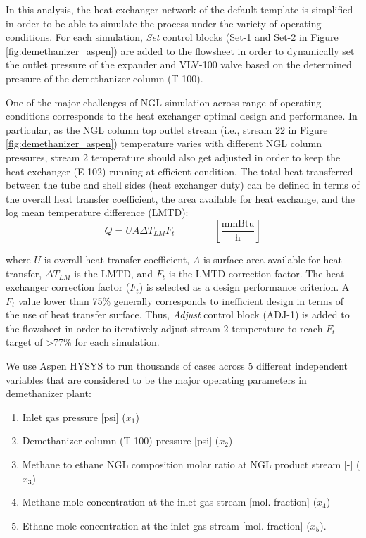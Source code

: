 \documentclass[11pt]{report}
\newcommand{\eqnunitfrac}[2]{\quad\quad \scriptstyle{\left[\frac{\text{#1}}{\text{#2}}\right]}}
\begin{document}
In this analysis, the heat exchanger network of the default template is simplified in order to be able to simulate the process under the variety of operating conditions. For each simulation, \emph{Set} control blocks (Set-1 and Set-2 in Figure \ref{fig:demethanizer_aspen}) are added to the flowsheet in order to dynamically set the outlet pressure of the expander and VLV-100 valve based on the determined pressure of the demethanizer column (T-100). 

One of the major challenges of NGL simulation across range of operating conditions corresponds to the heat exchanger optimal design and performance. In particular, as the NGL column top outlet stream (i.e., stream 22 in Figure \ref{fig:demethanizer_aspen}) temperature varies with different NGL column pressures, stream 2 temperature should also get adjusted in order to keep the heat exchanger (E-102) running at efficient condition. The total heat transferred between the tube and shell sides (heat exchanger duty) can be defined in terms of the overall heat transfer coefficient, the area available for heat exchange, and the log mean temperature difference (LMTD):
\begin{equation} \label{eq:shell_and_tube_HE}
Q=UA\Delta T_{LM}F_{t} \quad\quad\eqnunitfrac{mmBtu}{h}
\end{equation}

where $U$ is overall heat transfer coefficient, $A$ is surface area available for heat transfer, $\Delta T_{LM}$ is the LMTD, and $F_{t}$ is the LMTD correction factor. The heat exchanger correction factor ($F_{t}$) is selected as a design performance criterion. A $F_{t}$ value lower than 75\% generally corresponds to inefficient design in terms of the use of heat transfer surface. Thus, \emph{Adjust} control block (ADJ-1) is added to the flowsheet in order to iteratively adjust stream 2 temperature to reach $F_{t}$ target of >77\% for each simulation.       

We use Aspen HYSYS to run thousands of cases across 5 different independent variables that are considered to be the major operating parameters in demethanizer plant:
\begin{enumerate}
\item Inlet gas pressure [psi] ($x_1$)
\item Demethanizer column (T-100) pressure [psi] ($x_2$)
\item Methane to ethane NGL composition molar ratio at NGL product stream [-] ($x_3$)
\item Methane mole concentration at the inlet gas stream [mol. fraction] ($x_4$)
\item Ethane mole concentration at the inlet gas stream [mol. fraction] ($x_5$).
\end{enumerate}
\end{document}
